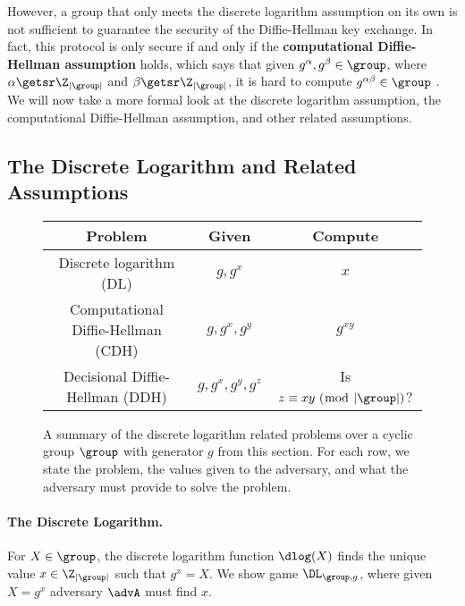 However, a group that only meets the discrete logarithm assumption on its own is not sufficient to guarantee the security of the Diffie-Hellman key exchange. In fact, this protocol is only secure if and only if the \textbf{computational Diffie-Hellman assumption} holds, which says that given $g^\alpha, g^\beta \in \group$, where $\alpha \getsr \Z_{|\group|}$ and $\beta \getsr \Z_{|\group|}$, it is hard to compute $g^{\alpha\beta} \in \group$ \cite{BonehShoupBook}. We will now take a more formal look at the discrete logarithm assumption, the computational Diffie-Hellman assumption, and other related assumptions. 

\subsection{The Discrete Logarithm and Related Assumptions}

\begin{figure}
	\center
	\begin{tabular}{|c|c|c|}
		\hline
		Problem & Given & Compute \\
		\hline \hline
		Discrete logarithm (DL) & $g, g^x$ & $x$ \\
		\hline
		Computational Diffie-Hellman (CDH) & $g,g^x,g^y$ & $g^{xy}$ \\
		\hline
		Decisional Diffie-Hellman (DDH) & $g, g^x, g^y, g^z$ & Is $z \equiv xy\ (\bmod \ |\group|)$? \\
		\hline
	\end{tabular}
	\caption{A summary of the discrete logarithm related problems over a cyclic group $\group$ with generator $g$ from this section. For each row, we state the problem, the values given to the adversary, and what the adversary must provide to solve the problem.}
	\label{fig:DL}
\end{figure}

\paragraph{The Discrete Logarithm.} For $X \in \group$, the discrete logarithm function $\dlog(X)$ finds the unique value $x \in \Z_{|\group|}$ such that $g^x = X$. We show game $\DL_{\group, g}$, where given $X = g^x$ adversary $\advA$ must find $x$. 

\begin{center}
\end{center}

